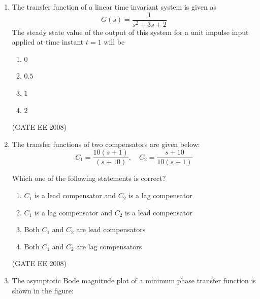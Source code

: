 \documentclass[journal,12pt,onecolumn]{IEEEtran}
\theoremstyle{remark}
\begin{document}
\begin{enumerate}[start=1, label=Q.\arabic*]
The average voltage across the load and the average current through the diode will respectively be

\begin{multicols}{4}
\begin{enumerate}
    \item $10$ V, $2$ A
    \item $10$ V, $8$ A
    \item $40$ V, $2$ A
    \item $40$ V, $8$ A
\end{enumerate}
\end{multicols}
\hfill (GATE EE 2008)


\item The transfer function of a linear time invariant system is given as
$$
G(s)=\frac{1}{s^2+3s+2}
$$
The steady state value of the output of this system for a unit impulse input applied at time instant $t=1$ will be

\begin{multicols}{4}
\begin{enumerate}
    \item $0$
    \item $0.5$
    \item $1$
    \item $2$
\end{enumerate}
\end{multicols}
\hfill (GATE EE 2008)


\item The transfer functions of two compensators are given below:
$$
C_1 = \frac{10(s+1)}{(s+10)}, \quad C_2 = \frac{s+10}{10(s+1)}
$$

Which one of the following statements is correct?
\begin{enumerate}
    \item $C_1$ is a lead compensator and $C_2$ is a lag compensator
    \item $C_1$ is a lag compensator and $C_2$ is a lead compensator
    \item Both $C_1$ and $C_2$ are lead compensators
    \item Both $C_1$ and $C_2$ are lag compensators
\end{enumerate}
\hfill (GATE EE 2008)


\item The asymptotic Bode magnitude plot of a minimum phase transfer function is shown in the figure:


\end{enumerate}
\end{document}
